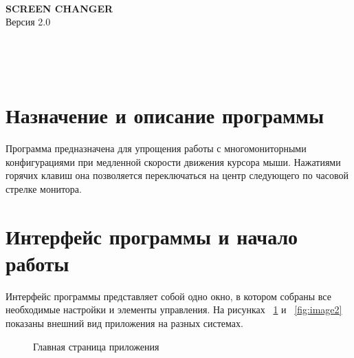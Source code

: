 \documentclass[a4paper]{article}
\begin{document}
\def\figurename{Рисунок}

\makeatletter
\lst@UserCommand{}
\makeatother
 
\begin{center}
\large{\textbf{SCREEN CHANGER}}\\
Версия 2.0\\
\end{center}
\thispagestyle{empty} 
    \tableofcontents %
\newpage

\section{Назначение и описание программы}

Программа предназначена для упрощения работы с многомониторными конфигурациями при медленной скорости движения курсора мыши. Нажатиями горячих клавиш она позволяется переключаться на центр следующего по часовой стрелке монитора.

\section{Интерфейс программы и начало работы}

Интерфейс программы представляет собой одно окно, в котором собраны все необходимые настройки и элементы управления. На рисунках ~\ref{fig:image1} и ~\ref{fig:image2} показаны внешний вид приложения на разных системах.

\begin{figure}[h]
\caption{Главная страница приложения}
\label{fig:image1}
\end{figure}
\end{document}
